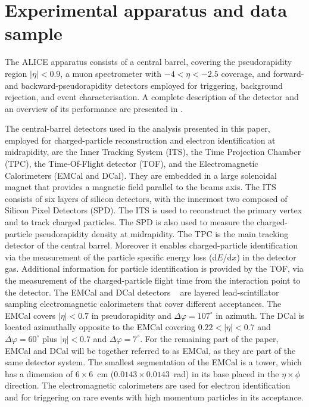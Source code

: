\section{Experimental apparatus and data sample}\label{sec:datasampleandselection}

The ALICE apparatus consists of a central barrel, covering the pseudorapidity region $|\eta| < 0.9$, a muon
spectrometer with $-4 < \eta < -2.5$ coverage, and forward- and backward-pseudorapidity detectors employed for triggering, background rejection, and event characterisation. A complete description of the
detector and an overview of its performance are presented in \cite{Aamodt:2008zz, Abelev:2014ffa}. 

The central-barrel detectors used in the analysis presented in this paper, employed for charged-particle reconstruction and electron identification at midrapidity, are the Inner Tracking System (ITS), the Time Projection Chamber (TPC), the Time-Of-Flight detector (TOF), and the Electromagnetic Calorimeters (EMCal and DCal). They are embedded in a large solenoidal magnet that provides a magnetic field parallel to the beams axis. The ITS consists of six layers of silicon detectors, with the innermost two composed of Silicon Pixel Detectors (SPD). The ITS is used to reconstruct the primary vertex and to track charged particles.  The SPD is also used to measure the charged-particle pseudorapidity density at midrapidity. The TPC is the main tracking detector of the central barrel. Moreover it enables charged-particle
 identification via the measurement of the particle specific energy loss (d$E$/d$x$) in the detector gas. Additional information for particle identification is provided by the TOF, via the measurement of the charged-particle flight time from the interaction point to the detector. The EMCal and DCal detectors ~\cite{Cortese:1121574, Allen:2010stl} are layered lead-scintillator sampling electromagnetic calorimeters that cover different acceptances. The EMCal covers $|\eta| < 0.7$ in pseudorapidity and $\Delta\varphi = 107^{\circ}$ in azimuth. The DCal is located azimuthally opposite to the EMCal covering $0.22 < |\eta| < 0.7$ and $\Delta\varphi = 60^{\circ}$ plus $|\eta| < 0.7$ and $\Delta\varphi = 7^{\circ}$. For the remaining part of the paper, EMCal and DCal will be together referred to as EMCal, as they are part of the same detector system. The smallest segmentation of the EMCal is a tower, which has a dimension of $6 \times 6$~cm ($0.0143 \times 0.0143$~rad) in its base placed in the $\eta \times \phi$ direction. 
The electromagnetic calorimeters are used for electron identification and for triggering on rare events with high momentum particles in its acceptance. 

